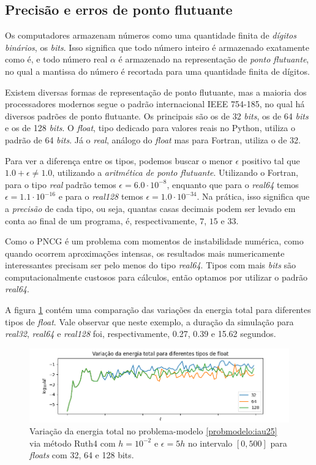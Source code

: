 \subsection{Precisão e erros de ponto flutuante}
Os computadores armazenam números como uma quantidade finita de \textit{dígitos binários}, os \textit{bits}. Isso significa que todo número inteiro é armazenado exatamente como é, e todo número real $\alpha$ é armazenado na representação de \textit{ponto flutuante}, no qual a mantissa do número é recortada para uma quantidade finita de dígitos.

Existem diversas formas de representação de ponto flutuante, mas a maioria dos processadores modernos segue o padrão internacional IEEE 754-185, no qual há diversos padrões de ponto flutuante. Os principais são os de 32 \textit{bits}, os de 64 \textit{bits} e os de 128 \textit{bits}. O \textit{float}, tipo dedicado para valores reais no Python, utiliza o padrão de 64 \textit{bits}. Já o \textit{real}, análogo do \textit{float} mas para Fortran, utiliza o de 32.

Para ver a diferença entre os tipos, podemos buscar o menor $\epsilon$ positivo tal que $1.0 + \epsilon \neq 1.0$, utilizando a \textit{aritmética de ponto flutuante}. Utilizando o Fortran, para o tipo \textit{real} padrão temos $\epsilon = 6.0 \cdot 10^{-8}$, enquanto que para o \textit{real64} temos $\epsilon = 1.1 \cdot 10^{-16}$ e para o \textit{real128} temos $\epsilon = 1.0 \cdot 10^{-34}$. Na prática, isso significa que a \textit{precisão} de cada tipo, ou seja, quantas casas decimais podem ser levado em conta ao final de um programa, é, respectivamente, $7$, $15$ e $33$.

Como o PNCG é um problema com momentos de instabilidade numérica, como quando ocorrem aproximações intensas, os resultados mais numericamente interessantes precisam ser pelo menos do tipo \textit{real64}. Tipos com mais \textit{bits} são computacionalmente custosos para cálculos, então optamos por utilizar o padrão \textit{real64}.

A figura \ref{fig:bits_energia} contém uma comparação das variações da energia total para diferentes tipos de \textit{float}. Vale observar que neste exemplo, a duração da simulação para \textit{real32}, \textit{real64} e \textit{real128} foi, respectivamente, 0.27, 0.39 e 15.62 segundos.

\begin{figure}
    \centering
    \includegraphics[width=\linewidth]{tcc//img/bits_energia.png}
    \caption{Variação da energia total no problema-modelo \ref{probmodelo:iau25} via método Ruth4 com $h=10^{-2}$ e $\epsilon=5h$ no intervalo $[0,500]$ para \textit{floats} com 32, 64 e 128 bits.}
    \label{fig:bits_energia}
\end{figure}

